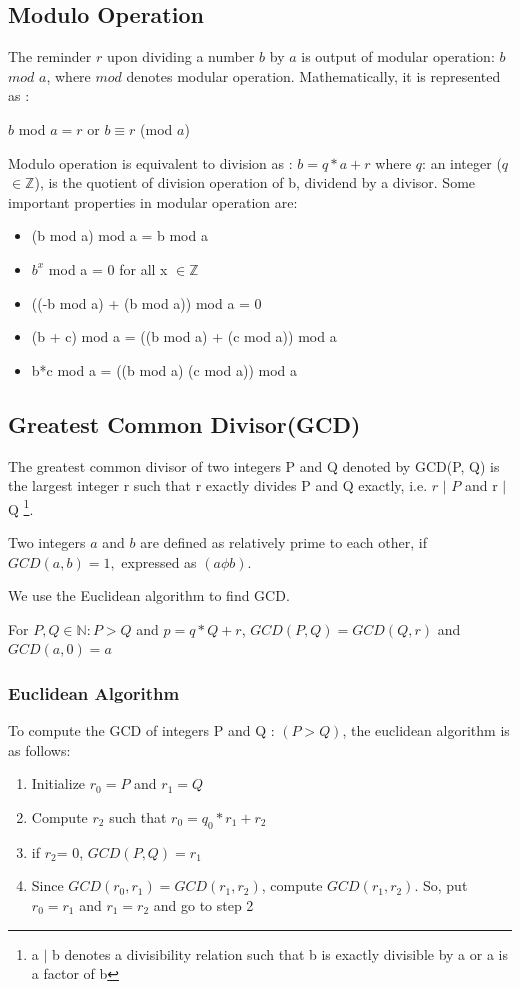 \subsection{Modulo Operation}
The reminder $r$ upon dividing a number $b$ by $a$ is output of modular operation: $b$  $mod$  $a$, where $mod$ denotes modular operation. Mathematically, it is represented as :  
\begin{center}
     $b$  mod  $a = r$  or  $b \equiv  r$ (mod $a$) 
\end{center}
Modulo operation is equivalent to division as :
 $b = q*a + r$  where $q$: an integer ($q$ $\in \mathbb{Z}$), is the quotient of division operation of b, dividend by a divisor. 
Some important properties in modular operation are:
\begin{itemize}
    \item (b mod a) mod a = b mod a
    \item $b^x$ mod a = 0 for all x $\in \mathbb{Z} $
    \item ((-b mod a) + (b mod a)) mod a = 0
    \item (b + c) mod a = ((b mod a) + (c mod a)) mod a 
    \item b*c mod a = ((b mod a) (c mod a)) mod a
\end{itemize}
\subsection{Greatest Common Divisor(GCD)}
The greatest common divisor of two integers P and Q denoted by GCD(P, Q) is the largest integer r such that r exactly divides P and Q exactly, i.e. $r$ $\mid$ $P$ and r $\mid$ Q \footnote{a $\mid$ b denotes a divisibility relation such that b is exactly divisible by a or a is a factor of b}.
\begin{definition}
    Two integers $a$ and $b$ are defined as relatively prime to each other, if $GCD(a,b) = 1,$ expressed as $(a \phi b). $
\end{definition}
We use the Euclidean algorithm to find GCD. 
\begin{lemma}
    For $P,Q \in \mathbb{N}: P > Q$ and $ p = q*Q + r$, $ GCD(P,Q) = GCD(Q,r)$ and $ GCD(a,0) = a $
\end{lemma}
\subsubsection{Euclidean Algorithm}
To compute the GCD of integers P and Q : $(P>Q)$, the euclidean algorithm is as follows:
\begin{enumerate}
    \item Initialize $r_0=P$ and $r_1= Q$
    \item Compute $r_2$ such that $r_0 = q_0 * r_1 + r_2$
    \item if $r_2$= 0, $GCD(P,Q) = r_1$
    \item  Since $GCD(r_0,r_1) = GCD(r_1,r_2) $, compute $GCD(r_1,r_2)$. So, put $r_0 = r_1$ and $r_1 = r_2$ and go to step 2
\end{enumerate}

